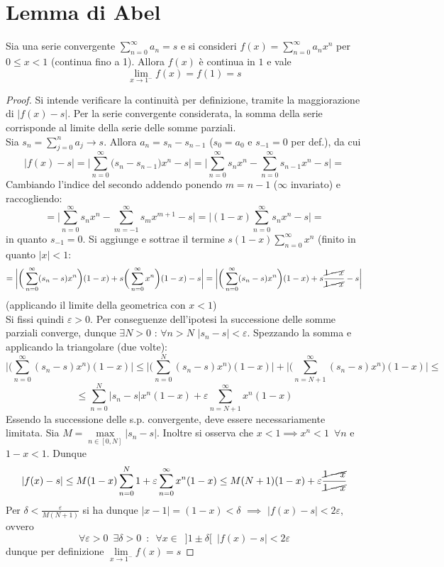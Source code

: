 \documentclass[10pt, oneside]{book}
\theoremstyle{plain}
\begin{document}
\section{Lemma di Abel}
\begin{lem}
Sia una serie convergente $\displaystyle \sum\limits_{n=0}^\infty a_n = s$ e si consideri $\displaystyle f(x) = \sum\limits_{n=0}^\infty a_n x^n$ per $0 \leq x < 1$ (continua fino a 1). Allora $f(x)$ è continua in $1$ e vale
\[\lim\limits_{x \rightarrow 1^-} f(x) = f(1) = s\]
\end{lem}
\begin{proof}
Si intende verificare la continuità per definizione, tramite la maggiorazione di $|f(x) - s|$. Per la serie convergente considerata, la somma della serie corrisponde al limite della serie delle somme parziali.
\\Sia $\displaystyle s_n = \sum\limits_{j=0}^n a_j \rightarrow s$. Allora $a_n = s_{n} - s_{n-1}$ ($s_0 = a_0$ e $s_{-1} = 0$ per def.), da cui
\[|f(x) - s| = \bigg|\sum\limits_{n=0}^\infty \big( s_{n} - s_{n-1}\big) x^n - s\bigg| = \bigg|\sum\limits_{n=0}^\infty s_n x^n - \sum\limits_{n=0}^\infty s_{n-1} x^n - s \bigg| =\]
Cambiando l'indice del secondo addendo ponendo $m = n-1$ ($\infty$ invariato) e raccogliendo:
\[= \bigg|\sum\limits_{n=0}^\infty s_n x^n - \sum\limits_{m=-1}^\infty s_m x^{m+1} - s \bigg| = \bigg|(1-x) \sum\limits_{n=0}^\infty s_n x^n - s \bigg| = \]
in quanto $s_{-1} = 0$. Si aggiunge e sottrae il termine $\displaystyle s (1-x) \sum\limits_{n=0}^\infty x^n$ (finito in quanto $|x| < 1$:
\[= \bigg|\bigg(\sum\limits_{n=0}^\infty (s_n - s) x^n\bigg) (1-x) + s \bigg(\sum\limits_{n=0}^\infty x^n\bigg) (1-x) -s \bigg| = \bigg|\bigg(\sum\limits_{n=0}^\infty (s_n - s) x^n\bigg) (1-x) + s \frac{\cancel{1- x}}{\cancel{1 - x}} -s \bigg|\]
(applicando il limite della geometrica con $x < 1$)
\\Si fissi quindi $\varepsilon > 0$. Per conseguenze dell'ipotesi la successione delle somme parziali converge, dunque $\exists N > 0$ : $\forall n > N$ $|s_n - s| < \varepsilon$. Spezzando la somma e applicando la triangolare (due volte):
\[\bigg|\bigg(\sum\limits_{n=0}^\infty (s_n - s) x^n\bigg) (1-x)\bigg| \leq \bigg|\bigg(\sum\limits_{n=0}^N (s_n - s) x^n\bigg) (1-x)\bigg| + \bigg|\bigg(\sum\limits_{n=N+1}^\infty (s_n - s) x^n\bigg) (1-x)\bigg| \leq\]
\[ \leq \sum\limits_{n=0}^N |s_n - s| x^n (1-x) + \varepsilon \sum\limits_{n=N+1}^\infty x^n (1-x)\]
Essendo la successione delle s.p. convergente, deve essere necessariamente limitata. Sia $\displaystyle M = \max\limits_{n \in [0,N]} |s_n - s|$. Inoltre si osserva che $x < 1 \implies x^n < 1 \enspace \forall n$ e $1-x < 1$. Dunque
\[|f(x) - s| \leq M (1-x) \sum\limits_{n=0}^N 1 + \varepsilon \sum\limits_{n=0}^\infty x^n (1-x) \leq M (N+1) (1-x) + \varepsilon \frac{\cancel{1-x}}{\cancel{1-x}}\]
Per $\displaystyle \delta < \frac{\varepsilon}{M (N+1)}$ si ha dunque $|x - 1| = (1-x) < \delta$ $\implies$ $|f(x) - s| < 2 \varepsilon$, ovvero
\[\forall \varepsilon > 0 \enspace \exists \delta > 0 \enspace : \enspace \forall x \in \enspace ]1 \pm \delta[ \enspace |f(x) - s| < 2\varepsilon\]
dunque per definizione $\displaystyle \lim\limits_{x \rightarrow 1^-} f(x) = s$
\end{proof}
\end{document}
